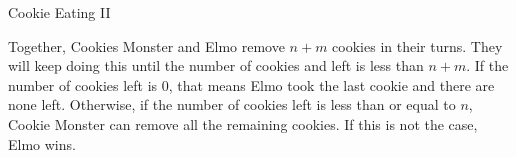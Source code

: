 \begin{tutorial}{Cookie Eating II}

Together, Cookies Monster and Elmo remove $n+m$ cookies in their turns. They will keep doing this until the number of cookies and left is less than $n+m$. If the number of cookies left is $0$, that means Elmo took the last cookie and there are none left. Otherwise, if the number of cookies left is less than or equal to $n$, Cookie Monster can remove all the remaining cookies. If this is not the case, Elmo wins.


\end{tutorial}
